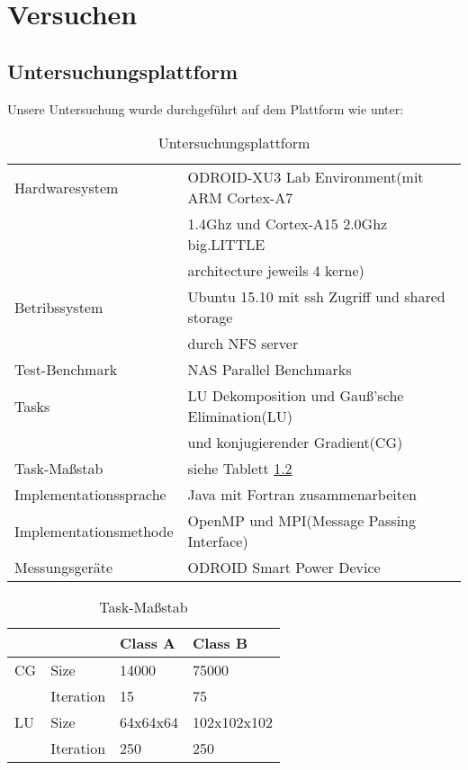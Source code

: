 \chapter{Versuchen}
\label{chap:Versuchen}

\section{Untersuchungsplattform}
\label{sec:Untersuchungsplattform}
Unsere Untersuchung wurde durchgeführt auf dem Plattform wie unter:

\begin{table}[htbp]
\begin{center}
\begin{tabular}{ l | l }
	Hardwaresystem 	& ODROID-XU3 Lab Environment(mit ARM Cortex-A7\\
					& 1.4Ghz und Cortex-A15 2.0Ghz big.LITTLE\\
					& architecture jeweils 4 kerne)\\ \hline
	Betribssystem 	& Ubuntu 15.10 mit ssh Zugriff und shared storage\\
					& durch NFS server\\ \hline
	Test-Benchmark 	& NAS Parallel Benchmarks\\ \hline
	Tasks 			& LU Dekomposition und Gauß'sche Elimination(LU)\\ 
					& und konjugierender Gradient(CG)\\ \hline
	Task-Maßstab	& siehe Tablett \ref{tab:Task-Massstab}\\ \hline
	Implementationssprache 	& Java mit Fortran zusammenarbeiten\\ \hline
	Implementationsmethode 	& OpenMP und MPI(Message Passing Interface)\\ \hline
	Messungsgeräte & ODROID Smart Power Device 
\end{tabular}
\end{center}
\label{tab:Untersuchungsplattform}
\caption{Untersuchungsplattform}
\end{table}

\begin{table}[htbp]
\begin{center}
\begin{tabular}{l|l|l|l}
	&			&Class A 	&Class B\\ \hline
CG 	&Size		&14000		&75000\\
	&Iteration	&15			&75\\ \hline
LU 	&Size		&64x64x64	&102x102x102\\
	&Iteration	&250		&250\\
\end{tabular}
\end{center}
\label{tab:Task-Massstab}
\caption{Task-Maßstab}
\end{table}

